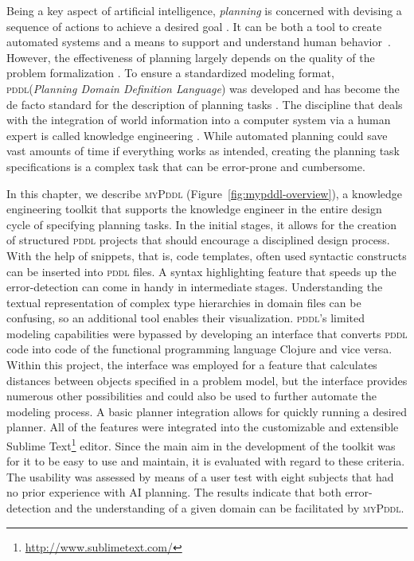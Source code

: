 \documentclass[runningheads]{llncs}
\newcommand{\mypddl}{\textsc{myPddl}\xspace}
\newcommand{\pddl}{\textsc{pddl}\xspace}
\begin{document}
Being a key aspect of artificial intelligence, \emph{planning} is
concerned with devising a sequence of actions to achieve a desired
goal \cite{helmert2008understanding}. It can be both a tool to create
automated systems and a means to support and understand human
behavior~\cite{konar1999artificial}. However, the effectiveness of
planning largely depends on the quality of the problem formalization
\cite{shah2013knowledge}. To ensure a standardized modeling format,
\pddl (\emph{Planning Domain Definition Language})
\cite{mcdermott1998pddl} was developed and has become the de facto
standard for the description of planning tasks
\cite{ilghami2005extension}. The discipline that deals with the
integration of world information into a computer system via a human
expert is called knowledge engineering \cite{feigenbaum1983fifth}.
While automated planning could save vast amounts of time if everything
works as intended, creating the planning task specifications is a
complex task that can be error-prone and cumbersome.

In this chapter, we describe \mypddl
(Figure~\ref{fig:mypddl-overview}), a knowledge engineering toolkit
that supports the knowledge engineer in the entire design cycle of
specifying planning tasks. In the initial stages, it allows for the
creation of structured \pddl projects that should encourage a
disciplined design process. With the help of snippets, that is, code
templates, often used syntactic constructs can be inserted into \pddl
files. A syntax highlighting feature that speeds up the
error-detection can come in handy in intermediate
stages. Understanding the textual representation of complex type
hierarchies in domain files can be confusing, so an additional tool
enables their visualization. \pddl's limited modeling capabilities
were bypassed by developing an interface that converts \pddl code into
code of the functional programming language Clojure
\cite{hickey2008clojure} and vice versa.  Within this project, the
interface was employed for a feature that calculates distances between
objects specified in a problem model, but the interface provides
numerous other possibilities and could also be used to further
automate the modeling process. A basic planner integration allows for
quickly running a desired planner. All of the features were integrated
into the customizable and extensible Sublime
Text\footnote{\url{http://www.sublimetext.com/}} editor. Since the
main aim in the development of the toolkit was for it to be easy to
use and maintain, it is evaluated with regard to these criteria. The
usability was assessed by means of a user test with eight subjects
that had no prior experience with AI planning. The results indicate
that both error-detection and the understanding of a given domain can
be facilitated by \mypddl.
\end{document}
